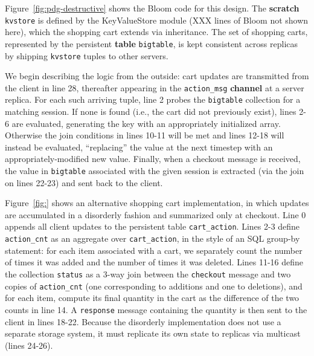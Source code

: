 Figure~\ref{fig:pdg-destructive} shows the Bloom code for this design.
The 
\textbf{scratch} \texttt{kvstore} is defined by the KeyValueStore module (XXX lines of Bloom not shown here), 
which the shopping cart extends via inheritance.
The set of shopping carts, represented by the persistent \textbf{table} \texttt{bigtable}, is kept 
consistent across replicas by shipping \texttt{kvstore} tuples to other servers.

We begin describing the logic from the outside:
cart updates are transmitted from the client in line 28,
thereafter appearing in the \texttt{action\_msg} \textbf{channel} at a server replica.
For each such arriving tuple,
line 2 probes the \texttt{bigtable} collection for a matching
session.  If none is found (i.e., the cart did not previously exist), lines 2-6 are evaluated, generating
the key with an appropriately initialized array. 
Otherwise the join conditions
in lines 10-11 will be met and lines 12-18 will instead be evaluated, ``replacing'' the value at the next timestep with an appropriately-modified new value.
Finally, when a checkout message is received, the value in \texttt{bigtable}
associated with the given session is extracted (via the join on lines 22-23)
and sent back to the client.

Figure~\ref{fig:} shows an alternative shopping cart implementation, in which
updates are accumulated in a disorderly fashion and summarized only at 
checkout.  Line 0 appends all client updates to the persistent table 
\texttt{cart\_action}.  Lines 2-3 define \texttt{action\_cnt} as an aggregate
over \texttt{cart\_action}, in the style of an SQL group-by statement: for
each item associated with a cart, we separately count the number of times it was added and the number of times it was deleted.
Lines 11-16 define the collection \texttt{status} as a 3-way
join between the \texttt{checkout} message and two copies of 
\texttt{action\_cnt} (one corresponding to additions and one to deletions),
and for each item, compute its final quantity in the cart as the difference of the two counts
in line 14.  A \texttt{response} message containing the quantity is then sent 
to the client in lines 18-22.  Because the disorderly implementation does not
use a separate storage system, it must replicate its own state to replicas 
via multicast (lines 24-26).


